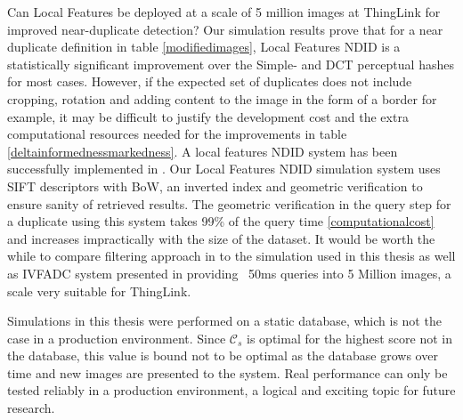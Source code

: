 \documentclass[english,12pt,a4paper,pdftex,elec,utf8, table]{aaltothesis}
\begin{document}
Can Local Features be deployed at a scale of 5 million images at ThingLink for improved near-duplicate detection? Our simulation results prove that for a near duplicate definition in table \ref{modifiedimages}, Local Features NDID is a statistically significant improvement over the Simple- and DCT perceptual hashes for most cases. However, if the expected set of duplicates does not include cropping, rotation and adding content to the image in the form of a border for example, it may be difficult to justify the development cost and the extra computational resources needed for the improvements in table \ref{deltainformednessmarkedness}. A local features NDID system has been successfully implemented in \cite{dong2012high}. Our Local Features NDID simulation system uses SIFT descriptors with BoW, an inverted index and geometric verification to ensure sanity of retrieved results. The geometric verification in the query step for a duplicate using this system takes 99\% of the query time \ref{computationalcost} and increases impractically with the size of the dataset. It would be worth the while to compare filtering approach in \cite{dong2012high} to the simulation used in this thesis as well as IVFADC system presented in \cite{Jegou2010} providing ~50ms queries into 5 Million images, a scale very suitable for ThingLink.

Simulations in this thesis were performed on a static database, which is not the case in a production environment. Since $\mathcal{C}_s$ is optimal for the highest score not in the database, this value is bound not to be optimal as the database grows over time and new images are presented to the system. Real performance can only be tested reliably in a production environment, a logical and exciting topic for future research.

\clearpage


{}

{}
\end{document}
